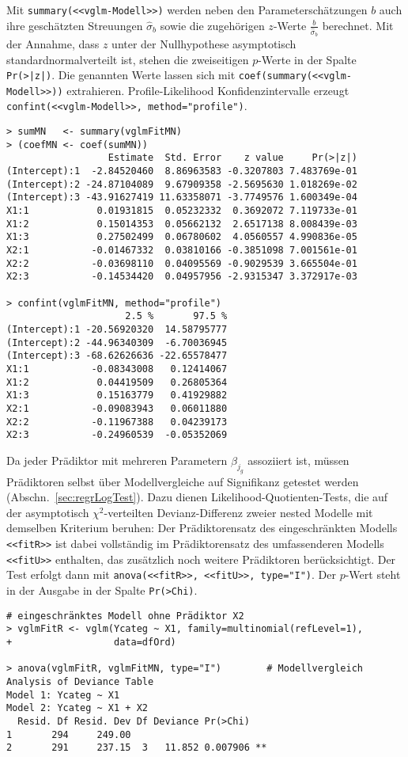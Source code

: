 Mit \lstinline!summary(<<vglm-Modell>>)! werden neben den Parameterschätzungen $b$ auch ihre geschätzten Streuungen $\hat{\sigma}_{b}$ sowie die zugehörigen $z$-Werte $\frac{b}{\hat{\sigma}_{b}}$ berechnet. Mit der Annahme, dass $z$ unter der Nullhypothese asymptotisch standardnormalverteilt ist, stehen die zweiseitigen $p$-Werte in der Spalte \lstinline!Pr(>|z|)!. Die genannten Werte lassen sich mit \lstinline!coef(summary(<<vglm-Modell>>))! extrahieren. Profile-Likelihood Konfidenzintervalle erzeugt \lstinline!confint(<<vglm-Modell>>, method="profile")!.
\begin{lstlisting}
> sumMN   <- summary(vglmFitMN)
> (coefMN <- coef(sumMN))
                  Estimate  Std. Error    z value     Pr(>|z|)
(Intercept):1  -2.84520460  8.86963583 -0.3207803 7.483769e-01
(Intercept):2 -24.87104089  9.67909358 -2.5695630 1.018269e-02
(Intercept):3 -43.91627419 11.63358071 -3.7749576 1.600349e-04
X1:1            0.01931815  0.05232332  0.3692072 7.119733e-01
X1:2            0.15014353  0.05662132  2.6517138 8.008439e-03
X1:3            0.27502499  0.06780602  4.0560557 4.990836e-05
X2:1           -0.01467332  0.03810166 -0.3851098 7.001561e-01
X2:2           -0.03698110  0.04095569 -0.9029539 3.665504e-01
X2:3           -0.14534420  0.04957956 -2.9315347 3.372917e-03

> confint(vglmFitMN, method="profile")
                     2.5 %       97.5 %
(Intercept):1 -20.56920320  14.58795777
(Intercept):2 -44.96340309  -6.70036945
(Intercept):3 -68.62626636 -22.65578477
X1:1           -0.08343008   0.12414067
X1:2            0.04419509   0.26805364
X1:3            0.15163779   0.41929882
X2:1           -0.09083943   0.06011880
X2:2           -0.11967388   0.04239173
X2:3           -0.24960539  -0.05352069
\end{lstlisting}

Da jeder Prädiktor mit mehreren Parametern $\beta_{j_{g}}$ assoziiert ist, müssen Prädiktoren selbst über Modellvergleiche auf Signifikanz getestet werden (Abschn.\ \ref{sec:regrLogTest}). Dazu dienen Likelihood-Quotienten-Tests, die auf der asymptotisch $\chi^{2}$-verteilten Devianz-Differenz zweier nested Modelle mit demselben Kriterium beruhen: Der Prädiktorensatz des eingeschränkten Modells \lstinline!<<fitR>>! ist dabei vollständig im Prädiktorensatz des umfassenderen Modells \lstinline!<<fitU>>! enthalten, das zusätzlich noch weitere Prädiktoren berücksichtigt. Der Test erfolgt dann mit \lstinline!anova(<<fitR>>, <<fitU>>, type="I")!. Der $p$-Wert steht in der Ausgabe in der Spalte \lstinline!Pr(>Chi)!.
\begin{lstlisting}
# eingeschränktes Modell ohne Prädiktor X2
> vglmFitR <- vglm(Ycateg ~ X1, family=multinomial(refLevel=1),
+                  data=dfOrd)

> anova(vglmFitR, vglmFitMN, type="I")        # Modellvergleich
Analysis of Deviance Table
Model 1: Ycateg ~ X1
Model 2: Ycateg ~ X1 + X2
  Resid. Df Resid. Dev Df Deviance Pr(>Chi)   
1       294     249.00                        
2       291     237.15  3   11.852 0.007906 **
\end{lstlisting}

